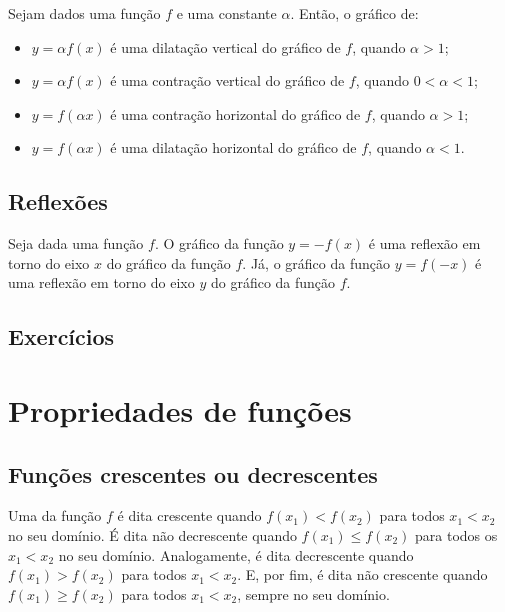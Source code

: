 Sejam dados uma função $f$ e uma constante $\alpha$. Então, o gráfico de:
\begin{itemize}
\item $y = \alpha f(x)$ é uma dilatação vertical do gráfico de $f$, quando $\alpha > 1$;
\item $y = \alpha f(x)$ é uma contração vertical do gráfico de $f$, quando $0<\alpha < 1$;
\item $y = f(\alpha x)$ é uma contração horizontal do gráfico de $f$, quando $\alpha > 1$;
\item $y = f(\alpha x)$ é uma dilatação horizontal do gráfico de $f$, quando $\alpha < 1$.
\end{itemize}

\subsection{Reflexões}

Seja dada uma função $f$. O gráfico da função $y = -f(x)$ é uma reflexão em torno do eixo $x$ do gráfico da função $f$. Já, o gráfico da função $y = f(-x)$ é uma reflexão em torno do eixo $y$ do gráfico da função $f$.

\subsection*{Exercícios}

\emconstrucao

\section{Propriedades de funções}\label{cap_funcao_sec_prop}

\subsection{Funções crescentes ou decrescentes}

Uma da função $f$ é dita crescente quando $f(x_1)<f(x_2)$ para todos $x_1<x_2$ no seu domínio. É dita não decrescente quando $f(x_1)\leq f(x_2)$ para todos os $x_1<x_2$ no seu domínio. Analogamente, é dita decrescente quando $f(x_1)>f(x_2)$ para todos $x_1<x_2$. E, por fim, é dita não crescente quando $f(x_1)\geq f(x_2)$ para todos $x_1<x_2$, sempre no seu domínio.

